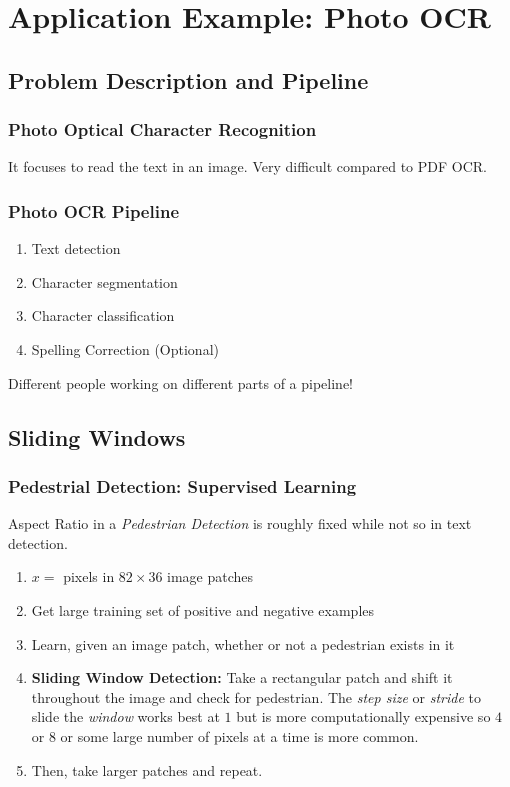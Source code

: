 \chapter{Application Example: Photo OCR}
\section{Problem Description and Pipeline}
\subsection{Photo Optical Character Recognition} It focuses to read the text
in an image. Very difficult compared to PDF OCR.

\subsection{Photo OCR Pipeline}
\begin{enumerate}
	\item Text detection
	\item Character segmentation
	\item Character classification
	\item Spelling Correction (Optional)
\end{enumerate}
Different people working on different parts of a pipeline!

\section{Sliding Windows}
\subsection{Pedestrial Detection: Supervised Learning}
Aspect Ratio in a \emph{Pedestrian Detection} is roughly fixed while not so
in text detection.
\begin{enumerate}
	\item $x = $ pixels in $82 \times 36$ image patches
	\item Get large training set of positive and negative examples
	\item Learn, given an image patch, whether or not a pedestrian exists in it
	\item \textbf{Sliding Window Detection:} Take a rectangular patch and shift it
	      throughout the image and check for pedestrian. The \emph{step size} or \emph{stride}
	      to slide the \emph{window} works best at $1$ but is more computationally expensive
	      so $4$ or $8$ or some large number of pixels at a time is more common.
	\item Then, take larger patches and repeat.
\end{enumerate}
